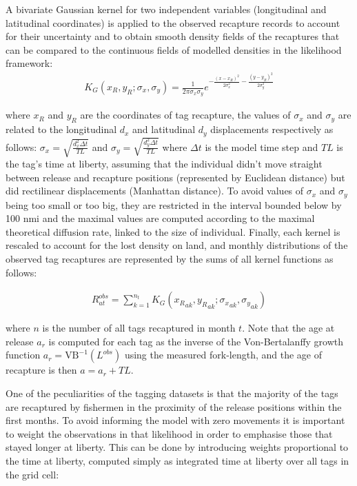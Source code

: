 A bivariate Gaussian kernel for two independent variables (longitudinal and latitudinal coordinates) is applied to the observed recapture records to account for their uncertainty and to obtain smooth density fields of the recaptures that can be compared to the continuous fields of modelled densities in the likelihood framework:
\begin{align}
K_G(x_R,y_R;\sigma_x,\sigma_y) = \frac{1}{2 \pi \sigma_x \sigma_y} e^{-\frac{\left(x-x_R\right)^2}{2\sigma_x^2}-\frac{\left(y-y_R\right)^2}{2\sigma_y^2}}
\label{eq:GK}
\end{align} 

\noindent where $x_R$ and $y_R$ are the coordinates of tag recapture, the values of $\sigma_x$ and $\sigma_y$ are related to the longitudinal $d_x$ and latitudinal $d_y$ displacements respectively as follows: $\sigma_x=\sqrt{\frac{d_x^2 \Delta t}{TL}}$ and $\sigma_y=\sqrt{\frac{d_y^2 \Delta t}{TL}}$ where $\Delta t$ is the model time step and $TL$ is the tag's time at liberty, assuming that the individual didn't move straight between release and recapture positions (represented by Euclidean distance) but did rectilinear displacements (Manhattan distance). To avoid  values of $\sigma_x$ and $\sigma_y$ being too small or too big, they are restricted in the interval bounded below by 100 nmi and the maximal values are computed according to the maximal theoretical diffusion rate, linked to the size of individual. Finally, each kernel is rescaled to account for the lost density on land, and monthly distributions of the observed tag recaptures are represented by the sums of all kernel functions as follows:

\begin{align}
R^{obs}_{at} = \sum^{n_t}_{k=1} K_G\left({x_R}_{ak},{y_R}_{ak};{\sigma_x}_{ak},{\sigma_y}_{ak}\right) 
\label{eq:Robs}
\end{align}

\noindent where $n$ is the number of all tags recaptured in month $t$. Note that the age at release $a_r$ is computed for each tag as the inverse of the Von-Bertalanffy growth function $a_r=\text{VB}^{-1}(L^{obs})$ using the measured fork-length, and the age of recapture is then $a = a_r+TL$. 

One of the peculiarities of the tagging datasets is that the majority of the tags are recaptured by fishermen in the proximity of the release positions within the first months. To avoid informing the model with zero movements it is important to weight the observations in that likelihood in order to emphasise those that stayed longer at liberty. This can be done by introducing weights proportional to the time at liberty, computed simply as integrated time at liberty over all tags in the grid cell:

